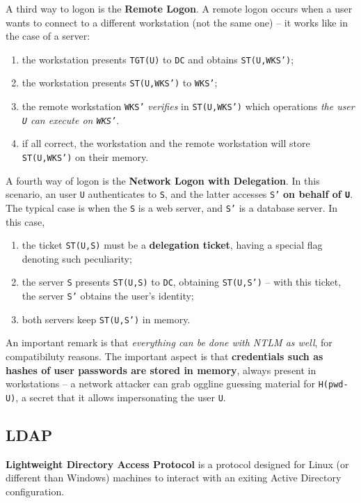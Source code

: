 \documentclass[10pt]{extbook}
\begin{document}
A third way to logon is the \textbf{Remote Logon}. A remote logon occurs when a
user wants to connect to a different workstation (not the same one) -- it works
like in the case of a server:
\begin{enumerate}
    \item the workstation presents \texttt{TGT(U)} to \texttt{DC} and obtains
        \texttt{ST(U,WKS')};
    \item the workstation presents \texttt{ST(U,WKS')} to \texttt{WKS'};
    \item the remote workstation \texttt{WKS'} \emph{verifies} in
        \texttt{ST(U,WKS')} which operations \emph{the user \texttt{U} can
        execute on \texttt{WKS'}}.
    \item if all correct, the workstation and the remote workstation will store
        \texttt{ST(U,WKS')} on their memory.
\end{enumerate}

A fourth way of logon is the \textbf{Network Logon with Delegation}. In this
scenario, an user \texttt{U} authenticates to \texttt{S}, and the latter
accesses \texttt{S'} \textbf{on behalf of \texttt{U}}. The typical case is when
the \texttt{S} is a web server, and \texttt{S'} is a database server. In this
case,
\begin{enumerate}
    \item the ticket \texttt{ST(U,S)} must be a \textbf{delegation ticket},
        having a special flag denoting such peculiarity;
    \item the server \texttt{S} presents \texttt{ST(U,S)} to \texttt{DC},
        obtaining \texttt{ST(U,S')} -- with this ticket, the server \texttt{S'}
        obtains the user's identity;
    \item both servers keep \texttt{ST(U,S')} in memory.
\end{enumerate}


An important remark is that \emph{everything can be done with NTLM as well},
for compatibiluty reasons. The important aspect is that \textbf{credentials
such as hashes of user passwords are stored in memory}, always present in
workstations -- a network attacker can grab oggline guessing material for
\texttt{H(pwd-U)}, a secret that it allows impersonating the user \texttt{U}.

\subsection{LDAP}

\textbf{Lightweight Directory Access Protocol} is a protocol designed for Linux
(or different than Windows) machines to interact with an exiting Active
Directory configuration.
\end{document}
